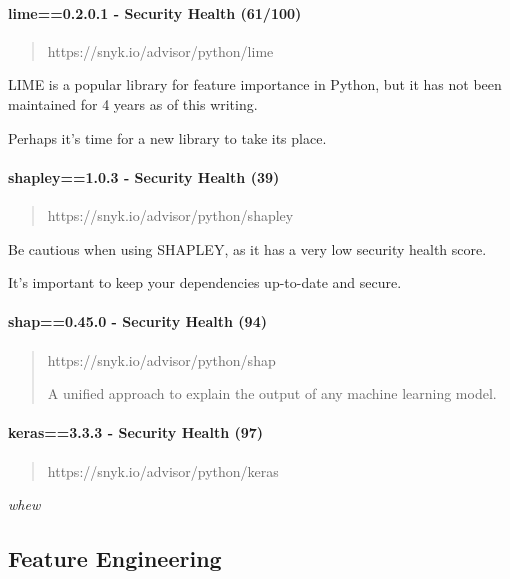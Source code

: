 \documentclass[11pt]{article}
\begin{document}
\paragraph{lime==0.2.0.1 - Security Health
(61/100)}\label{lime0.2.0.1---security-health-61100}

\begin{quote}
https://snyk.io/advisor/python/lime
\end{quote}

LIME is a popular library for feature importance in Python, but it has
not been maintained for 4 years as of this writing.

Perhaps it's time for a new library to take its place.

\paragraph{shapley==1.0.3 - Security Health
(39)}\label{shapley1.0.3---security-health-39}

\begin{quote}
https://snyk.io/advisor/python/shapley
\end{quote}

Be cautious when using SHAPLEY, as it has a very low security health
score.

It's important to keep your dependencies up-to-date and secure.

\paragraph{shap==0.45.0 - Security Health
(94)}\label{shap0.45.0---security-health-94}

\begin{quote}
https://snyk.io/advisor/python/shap

A unified approach to explain the output of any machine learning model.
\end{quote}

\paragraph{keras==3.3.3 - Security Health
(97)}\label{keras3.3.3---security-health-97}

\begin{quote}
https://snyk.io/advisor/python/keras
\end{quote}

\emph{whew}

    \subsection{Feature Engineering}\label{feature-engineering}
\end{document}
